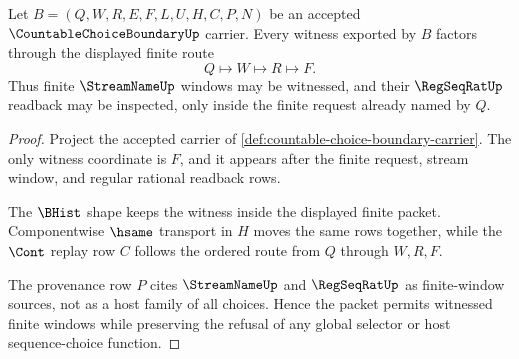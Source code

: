 \begin{theorem}
\label{thm:countable-choice-boundary-finite-witness-row}
Let $B=(Q,W,R,E,F,L,U,H,C,P,N)$ be an accepted $\CountableChoiceBoundaryUp$ carrier. Every witness exported by $B$ factors through the displayed finite route
$$
Q \longmapsto W \longmapsto R \longmapsto F .
$$
Thus finite $\StreamNameUp$ windows may be witnessed, and their $\RegSeqRatUp$ readback may be inspected, only inside the finite request already named by $Q$.
\end{theorem}
\begin{proof}
Project the accepted carrier of \autoref{def:countable-choice-boundary-carrier}. The only witness coordinate is $F$, and it appears after the finite request, stream window, and regular rational readback rows.

The $\BHist$ shape keeps the witness inside the displayed finite packet. Componentwise $\hsame$ transport in $H$ moves the same rows together, while the $\Cont$ replay row $C$ follows the ordered route from $Q$ through $W,R,F$.

The provenance row $P$ cites $\StreamNameUp$ and $\RegSeqRatUp$ as finite-window sources, not as a host family of all choices. Hence the packet permits witnessed finite windows while preserving the refusal of any global selector or host sequence-choice function.
\end{proof}

